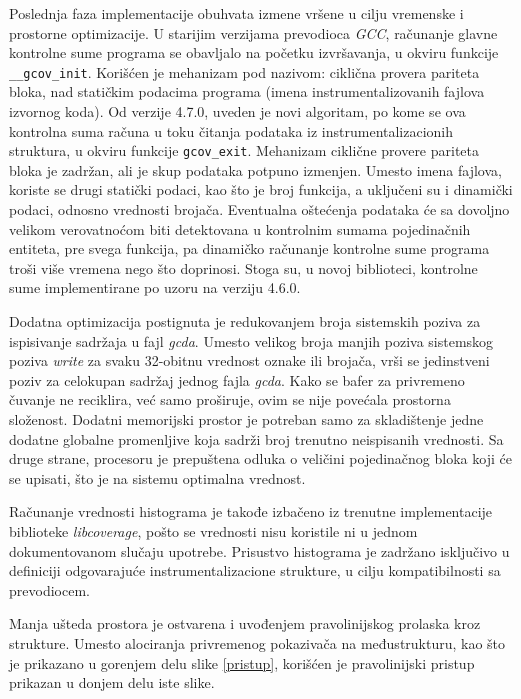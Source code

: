 \documentclass[12pt,oneside]{memoir}
\newcommand{\kod}[1]{\texttt{#1}}
\newcommand{\strano}[1]{\textit{#1}}
\begin{document}
Poslednja faza implementacije obuhvata izmene vršene u cilju vremenske i prostorne optimizacije. U starijim verzijama prevodioca \strano{GCC}, računanje glavne kontrolne sume programa se obavljalo na početku izvršavanja, u okviru funkcije \kod{\_\_gcov\_init}. Korišćen je mehanizam pod nazivom: ciklična provera pariteta bloka, nad statičkim podacima programa (imena instrumentalizovanih fajlova izvornog koda). Od verzije 4.7.0, uveden je novi algoritam, po kome se ova kontrolna suma računa u toku čitanja podataka iz instrumentalizacionih struktura, u okviru funkcije \kod{gcov\_exit}. Mehanizam ciklične provere pariteta bloka je zadržan, ali je skup podataka potpuno izmenjen. Umesto imena fajlova, koriste se drugi statički podaci, kao što je broj funkcija, a uključeni su i dinamički podaci, odnosno vrednosti brojača. Eventualna oštećenja podataka će sa dovoljno velikom verovatnoćom biti detektovana u kontrolnim sumama pojedinačnih entiteta, pre svega funkcija, pa dinamičko računanje kontrolne sume programa troši više vremena nego što doprinosi. Stoga su, u novoj biblioteci, kontrolne sume implementirane po uzoru na verziju 4.6.0. 

Dodatna optimizacija postignuta je redukovanjem broja sistemskih poziva za ispisivanje sadržaja u fajl \strano{gcda}. Umesto velikog broja manjih poziva sistemskog poziva \strano{write} za svaku 32-obitnu vrednost oznake ili brojača, vrši se jedinstveni poziv za celokupan sadržaj jednog fajla \strano{gcda}. Kako se bafer za privremeno čuvanje ne reciklira, već samo proširuje, ovim se nije povećala prostorna složenost. Dodatni memorijski prostor je potreban samo za skladištenje jedne dodatne globalne promenljive koja sadrži broj trenutno neispisanih vrednosti. Sa druge strane, procesoru je prepuštena odluka o veličini pojedinačnog bloka koji će se upisati, što je na sistemu optimalna vrednost. 

Računanje vrednosti histograma je takođe izbačeno iz trenutne implementacije biblioteke \strano{libcoverage}, pošto se vrednosti nisu koristile ni u jednom dokumentovanom slučaju upotrebe. Prisustvo histograma je zadržano isključivo u definiciji odgovarajuće instrumentalizacione strukture, u cilju kompatibilnosti sa prevodiocem. 

Manja ušteda prostora je ostvarena i uvođenjem pravolinijskog prolaska kroz strukture. Umesto alociranja privremenog pokazivača na međustrukturu, kao što je prikazano u gorenjem delu slike \ref{pristup}, korišćen je pravolinijski pristup prikazan u donjem delu iste slike. 
\end{document}
